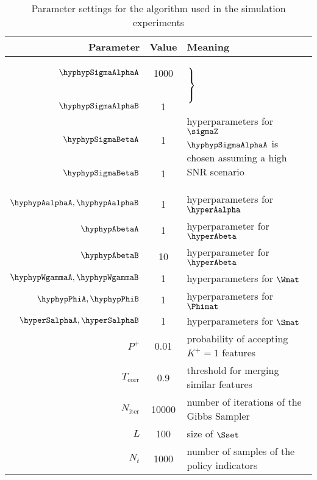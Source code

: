 \documentclass{article}
\begin{document}
\begin{table}
 \centering
 \caption{Parameter settings for the algorithm used in the simulation experiments}
 \label{tab::res::params}
 \begin{tabular}{r|c|l}
     Parameter & Value & Meaning \\  \hline \hline
     $\hyphypSigmaAlphaA$  & 1000 & \multirow{ 4}{*}{ \!\!\!\!\! $\left. \rule{0cm}{.8cm} \right\} $ \parbox{4cm}{hyperparameters for $\sigmaZ$\\ $\hyphypSigmaAlphaA$ is chosen assuming a high \ac{SNR} scenario}} 
  \\ $\hyphypSigmaAlphaB$ & 1 &
  \\ $\hyphypSigmaBetaA$ & 1 &
  \\ $\hyphypSigmaBetaB$ & 1 &
  \\ $\hyphypAalphaA, \hyphypAalphaB$  & 1 & hyperparameters for $\hyperAalpha$
  \\ $\hyphypAbetaA$  & 1 & hyperparameter for $\hyperAbeta$
  \\ $\hyphypAbetaB$  & 10 & hyperparameter for $\hyperAbeta$
  \\ $\hyphypWgammaA, \hyphypWgammaB$ & 1 & hyperparameters for $\Wmat$
  \\ $\hyphypPhiA, \hyphypPhiB$ & 1 & hyperparameters for $\Phimat$
  \\ $\hyperSalphaA, \hyperSalphaB$ & 1 & hyperparameters for $\Smat$
  \\ $P^+$          & 0.01  & probability of accepting $K^+=1$ features
  \\ $T_\text{corr}$ & 0.9 & threshold for merging similar features
  \\ $N_\text{iter}$ & 10000 & number of iterations of the Gibbs Sampler
  \\ $L$ & 100 & size of $\Sset$
  \\ $N_t$ & 1000 & number of samples of the policy indicators
 \end{tabular}
\end{table}
\end{document}
